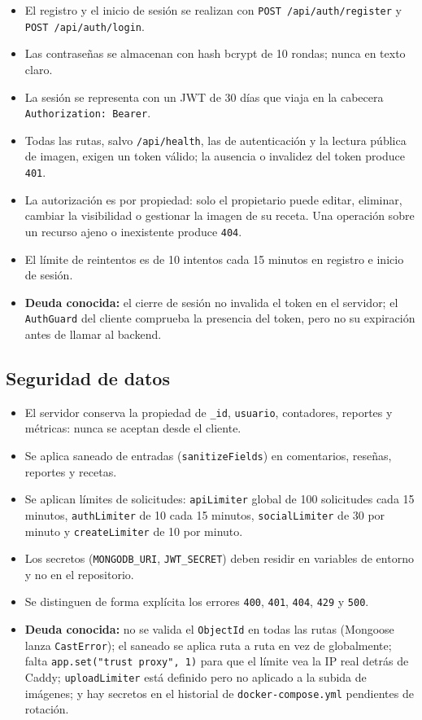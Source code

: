 \documentclass[doc,12pt,a4paper]{apa7}
\begin{document}
\begin{itemize}
    \item El registro y el inicio de sesión se realizan con \texttt{POST /api/auth/register} y \texttt{POST /api/auth/login}.
    \item Las contraseñas se almacenan con hash bcrypt de 10 rondas; nunca en texto claro.
    \item La sesión se representa con un JWT de 30 días que viaja en la cabecera \texttt{Authorization: Bearer}.
    \item Todas las rutas, salvo \texttt{/api/health}, las de autenticación y la lectura pública de imagen, exigen un token válido; la ausencia o invalidez del token produce \texttt{401}.
    \item La autorización es por propiedad: solo el propietario puede editar, eliminar, cambiar la visibilidad o gestionar la imagen de su receta. Una operación sobre un recurso ajeno o inexistente produce \texttt{404}.
    \item El límite de reintentos es de 10 intentos cada 15 minutos en registro e inicio de sesión.
    \item \textbf{Deuda conocida:} el cierre de sesión no invalida el token en el servidor; el \texttt{AuthGuard} del cliente comprueba la presencia del token, pero no su expiración antes de llamar al backend.
\end{itemize}

\subsection{Seguridad de datos}

\begin{itemize}
    \item El servidor conserva la propiedad de \texttt{\_id}, \texttt{usuario}, contadores, reportes y métricas: nunca se aceptan desde el cliente.
    \item Se aplica saneado de entradas (\texttt{sanitizeFields}) en comentarios, reseñas, reportes y recetas.
    \item Se aplican límites de solicitudes: \texttt{apiLimiter} global de 100 solicitudes cada 15 minutos, \texttt{authLimiter} de 10 cada 15 minutos, \texttt{socialLimiter} de 30 por minuto y \texttt{createLimiter} de 10 por minuto.
    \item Los secretos (\texttt{MONGODB\_URI}, \texttt{JWT\_SECRET}) deben residir en variables de entorno y no en el repositorio.
    \item Se distinguen de forma explícita los errores \texttt{400}, \texttt{401}, \texttt{404}, \texttt{429} y \texttt{500}.
    \item \textbf{Deuda conocida:} no se valida el \texttt{ObjectId} en todas las rutas (Mongoose lanza \texttt{CastError}); el saneado se aplica ruta a ruta en vez de globalmente; falta \texttt{app.set("trust proxy", 1)} para que el límite vea la IP real detrás de Caddy; \texttt{uploadLimiter} está definido pero no aplicado a la subida de imágenes; y hay secretos en el historial de \texttt{docker-compose.yml} pendientes de rotación.
\end{itemize}
\end{document}
